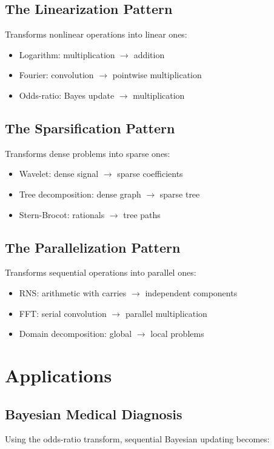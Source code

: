 \documentclass[12pt,a4paper]{article}
\theoremstyle{definition}
\begin{document}
\subsection{The Linearization Pattern}
Transforms nonlinear operations into linear ones:
\begin{itemize}
\item Logarithm: multiplication $\to$ addition
\item Fourier: convolution $\to$ pointwise multiplication
\item Odds-ratio: Bayes update $\to$ multiplication
\end{itemize}

\subsection{The Sparsification Pattern}
Transforms dense problems into sparse ones:
\begin{itemize}
\item Wavelet: dense signal $\to$ sparse coefficients
\item Tree decomposition: dense graph $\to$ sparse tree
\item Stern-Brocot: rationals $\to$ tree paths
\end{itemize}

\subsection{The Parallelization Pattern}
Transforms sequential operations into parallel ones:
\begin{itemize}
\item RNS: arithmetic with carries $\to$ independent components
\item FFT: serial convolution $\to$ parallel multiplication
\item Domain decomposition: global $\to$ local problems
\end{itemize}

\section{Applications}

\subsection{Bayesian Medical Diagnosis}

Using the odds-ratio transform, sequential Bayesian updating becomes:
\end{document}
